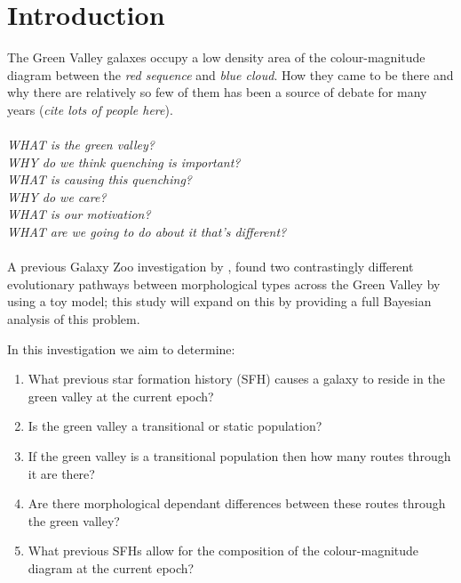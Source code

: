 \documentclass{mn2e}
\begin{document}
\section{Introduction}
The Green Valley galaxes occupy a low density area of the colour-magnitude diagram between the \emph{red sequence} and \emph{blue cloud}. How they came to be there and why there are relatively so few of them has been a source of debate for many years (\emph{cite lots of people here}). 
\\
\\
\emph{WHAT is the green valley?\\ WHY do we think quenching is important? \\ WHAT is causing this quenching? \\ WHY do we care? \\ WHAT is our motivation? \\ WHAT are we going to do about it that's different?}
\\
\\
A previous Galaxy Zoo investigation by  \cite{Sch2014}, found two contrastingly different evolutionary pathways between morphological types across the Green Valley by using a toy model; this study will expand on this by providing a full Bayesian analysis of this problem.

In this investigation we aim to determine: 
\begin{enumerate}
\item What previous star formation history (SFH) causes a galaxy to reside in the green valley at the current epoch?
\item Is the green valley a transitional or static population? 
\item If the green valley is a transitional population then how many routes through it are there? 
\item Are there morphological dependant differences between these routes through the green valley? 
\item What previous SFHs allow for the composition of the colour-magnitude diagram at the current epoch? 
\end{enumerate}
\end{document}
